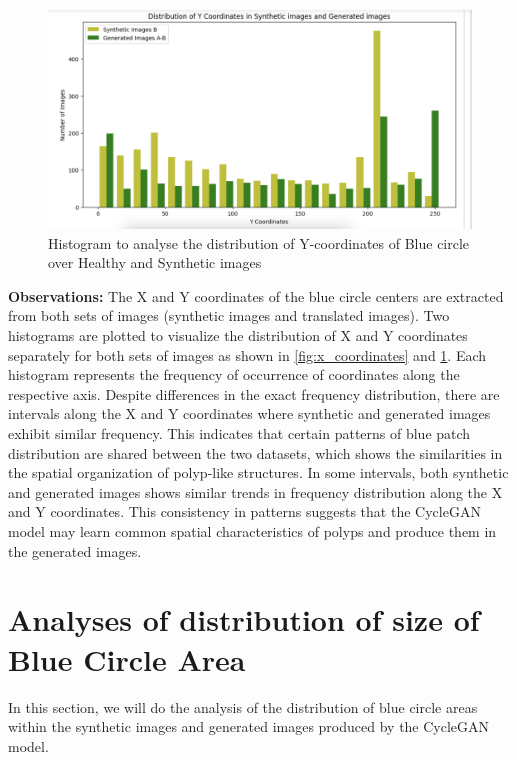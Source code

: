 \documentclass[UKenglish,12pt]{master-style}
\begin{document}
\begin{figure}[htbp]
    \centering
    \includegraphics[width=1\textwidth]{Images/y_coordinates.png}
    \caption{Histogram to analyse the distribution of Y-coordinates of Blue circle over Healthy and Synthetic images}
    \label{fig:y_coordinates}
\end{figure}

\textbf{Observations:}
The X and Y coordinates of the blue circle centers are extracted from both sets of images (synthetic images and translated images).
Two histograms are plotted to visualize the distribution of X and Y coordinates separately for both sets of images as shown in \ref{fig:x_coordinates} and \ref{fig:y_coordinates}. Each histogram represents the frequency of occurrence of coordinates along the respective axis.
Despite differences in the exact frequency distribution, there are intervals along the X and Y coordinates where synthetic and generated images exhibit similar frequency. This indicates that certain patterns of blue patch distribution are shared between the two datasets, which shows the  similarities in the spatial organization of polyp-like structures. In some intervals, both synthetic and generated images shows similar trends in frequency distribution along the X and Y coordinates. This consistency in patterns suggests that the CycleGAN model may learn common spatial characteristics of polyps and produce them in the generated images.


\section{Analyses of distribution of size of Blue Circle Area}
In this section, we will do the analysis of the distribution of blue circle areas within the synthetic images and generated images produced by the CycleGAN model. 
\end{document}
